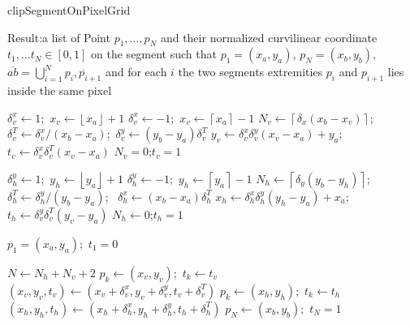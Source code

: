 \documentclass[11pt]{article}
\begin{document}
\newpage









\begin{algorithm}[h!]
\caption{clipSegmentOnPixelGrid}
\label{alg:clipSegmentOnPixelGrid}

Result:{a list of Point $p_1,\dots,p_N$ and their normalized curvilinear  coordinate $t_1,\dots t_N\in[0,1]$ on the segment such that 
$p_1=(x_a,y_a)$, $p_N=(x_b,y_b)$, $\overline{ab}=\bigcup_{i=1}^N\overline{p_i,p_{i+1}}$ and for each $i$ the two segments extremities $p_i$ and $p_{i+1}$ lies inside the same pixel}


{$\delta_v^x\leftarrow1$;~$x_v\leftarrow\left\lfloor x_a\right\rfloor+1$\;} 
{$\delta_v^x\leftarrow-1$;~$x_v\leftarrow\left\lceil x_a\right\rceil-1$\;}
{
$N_v\leftarrow \left\lceil \delta_x(x_b-x_v)\right\rceil$;~
$\delta_v^T\leftarrow \delta_v^x/(x_b-x_a)$;~$\delta_v^y\leftarrow (y_b-y_a)\delta_v^T$\;
$y_v\leftarrow \delta_v^x\delta_v^y (x_v-x_a)+y_a$;~
$t_v\leftarrow \delta_v^x\delta_v^T (x_v-x_a)$\;
}
{$N_v=0$;$t_v=1$\; }


{$\delta_h^y\leftarrow1$;~$y_h\leftarrow\left\lfloor y_a\right\rfloor+1$\;} 
{$\delta_h^y\leftarrow-1$;~$y_h\leftarrow\left\lceil y_a\right\rceil-1$\;}
{
$N_h\leftarrow \left\lceil \delta_y(y_b-y_h)\right\rceil$;~
$\delta_h^T\leftarrow \delta_h^y/(y_b-y_a)$;~
$\delta_h^x\leftarrow (x_b-x_a)\delta_h^T$\;
$x_h\leftarrow \delta_h^x\delta_h^y (y_h-y_a)+x_a$;~
$t_h\leftarrow \delta_v^y\delta_v^T (y_v-y_a)$\;
}
{$N_h \leftarrow  0$;$t_h=1$\;}

$p_1=(x_a,y_a)$;~$t_1=0$\;

$N \leftarrow N_h+N_v+2$\;
{
{
$p_k\leftarrow (x_v,y_v)$;~$t_k\leftarrow t_v$\;
$(x_v,y_v,t_v)\leftarrow (x_v+\delta_v^x,y_v+\delta_v^y,t_v+\delta_v^T)$\;
}
{
$p_k\leftarrow (x_h,y_h)$;~$t_k\leftarrow t_h$\;
$(x_h,y_h,t_h)\leftarrow (x_h+\delta_h^x,y_h+\delta_h^y,t_h+\delta_h^T)$\;
}
}
$p_{N}\leftarrow (x_b,y_b)$;~$t_N=1$\;
\end{algorithm}
\end{document}
